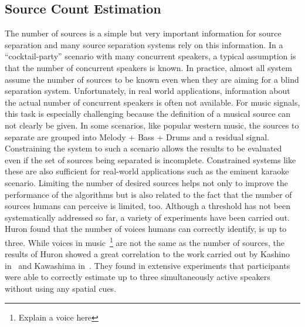 \subsection{Source Count Estimation}
The number of sources is a simple but very important information for source separation and many source separation 
systems rely on this information. 
In a “cocktail-party” scenario with many concurrent speakers, a typical assumption is that the number of concurrent speakers is known.
In practice, almost all system assume the number of sources to be known even when they are aiming for a blind separation system.
Unfortunately, in real world applications, information about the actual number of concurrent speakers
is often not available.
For music signals, this task is especially challenging because the definition of a musical source can not clearly be given.
In some scenarios, like popular western music, the sources to separate are grouped into Melody + Bass + Drums and a residual signal. 
Constraining the system to such a scenario allows the results to be evaluated even if the set of sources being separated is incomplete. 
Constrained systems like these are also sufficient for real-world applications such as the eminent karaoke scenario. Limiting the number of desired sources helps not only to improve the performance of the algorithms but is also related to the fact that the number of sources humans can perceive is limited, too. 
Although a threshold has not been systematically addressed so far, a variety of experiments have been carried out. 
Huron found \cite{huron89} that the number of voices humans can correctly identify, is up to three.
While voices in music~\footnote{Explain a voice here} are not the same as the number of sources, the results of Huron showed a great correlation to the work carried out by Kashino in~\cite{kashino96} and Kawashima in~\cite{kawashima15}.
They found in extensive experiments that participants were able to correctly estimate up to three simultaneously active speakers without using any spatial cues.



